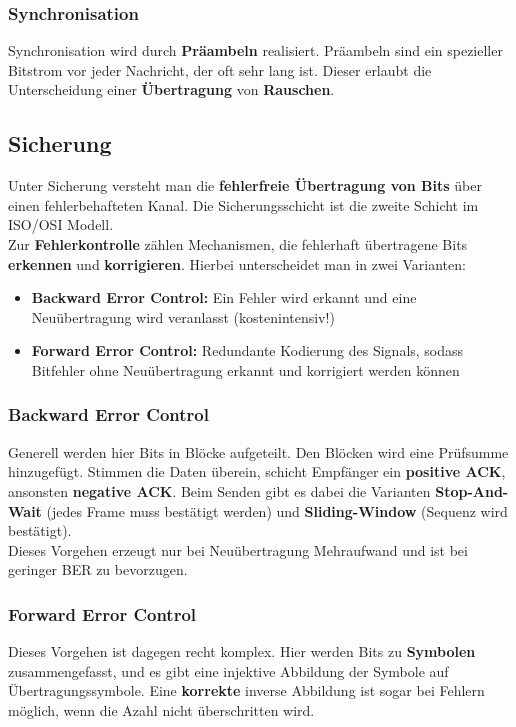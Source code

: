 \documentclass[a4paper]{article}
\begin{document}
\subsubsection{Synchronisation}
Synchronisation wird durch \textbf{Präambeln} realisiert. Präambeln sind ein spezieller Bitstrom vor jeder Nachricht, der oft sehr lang ist. Dieser erlaubt die Unterscheidung einer \textbf{Übertragung} von \textbf{Rauschen}.
	
\subsection{Sicherung}
Unter Sicherung versteht man die \textbf{fehlerfreie Übertragung von Bits} über einen fehlerbehafteten Kanal. Die Sicherungsschicht ist die zweite Schicht im ISO/OSI Modell.\\

Zur \textbf{Fehlerkontrolle} zählen Mechanismen, die fehlerhaft übertragene Bits \textbf{erkennen} und \textbf{korrigieren}. Hierbei unterscheidet man in zwei Varianten:
\begin{itemize}
	\item \textbf{Backward Error Control:} Ein Fehler wird erkannt und eine Neuübertragung wird veranlasst (kostenintensiv!)
	\item \textbf{Forward Error Control:} Redundante Kodierung des Signals, sodass Bitfehler ohne Neuübertragung erkannt und korrigiert werden können
\end{itemize}
\subsubsection{Backward Error Control}
Generell werden hier Bits in Blöcke aufgeteilt. Den Blöcken wird eine Prüfsumme hinzugefügt. Stimmen die Daten überein, schicht Empfänger ein \textbf{positive ACK}, ansonsten \textbf{negative ACK}. Beim Senden gibt es dabei die Varianten \textbf{Stop-And-Wait} (jedes Frame muss bestätigt werden) und \textbf{Sliding-Window} (Sequenz wird bestätigt). \\

Dieses Vorgehen erzeugt nur bei Neuübertragung Mehraufwand und ist bei geringer BER zu bevorzugen.
\subsubsection{Forward Error Control}
Dieses Vorgehen ist dagegen recht komplex. Hier werden Bits zu \textbf{Symbolen} zusammengefasst, und es gibt eine injektive Abbildung der Symbole auf Übertragungssymbole. Eine \textbf{korrekte} inverse Abbildung ist sogar bei Fehlern möglich, wenn die Azahl nicht überschritten wird.\\
\end{document}
